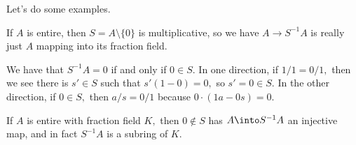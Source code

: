 Let's do some examples.
\begin{example}
    If $A$ is entire, then $S=A\setminus\{0\}$ is multiplicative, so we have $A\to S^{-1}A$ is really just $A$ mapping into its fraction field.
\end{example}
\begin{example}
    We have that $S^{-1}A=0$ if and only if $0\in S.$ In one direction, if $1/1=0/1,$ then we see there is $s'\in S$ such that $s'(1-0)=0,$ so $s'=0\in S.$ In the other direction, if $0\in S,$ then $a/s=0/1$ because $0\cdot(1a-0s)=0.$
\end{example}
\begin{example}
    If $A$ is entire with fraction field $K,$ then $0\notin S$ has $A\into S^{-1}A$ an injective map, and in fact $S^{-1}A$ is a subring of $K.$
\end{example}

